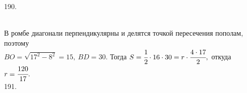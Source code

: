 \documentclass[12pt]{article}
\begin{document}
190. \begin{figure}[ht!]
\end{figure}\\
В ромбе диагонали перпендикулярны и делятся точкой пересечения пополам, поэтому\\ $BO=\sqrt{17^2-8^2}=15,\ BD=30.$ Тогда $S=\cfrac{1}{2}\cdot16\cdot30=r\cdot\cfrac{4\cdot17}{2},$ откуда $r=\cfrac{120}{17}.$\\
191. \begin{figure}[ht!]
\end{figure}\\
\end{document}
